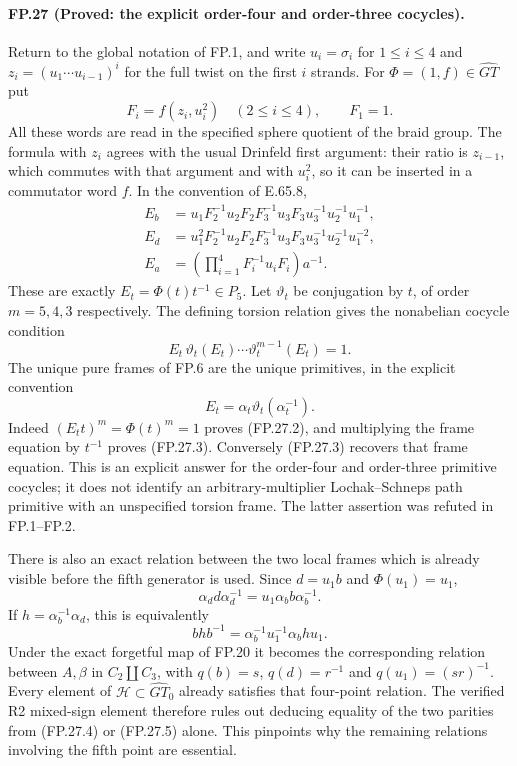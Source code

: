 \paragraph{FP.27 (Proved: the explicit order-four and order-three cocycles).}
Return to the global notation of FP.1, and write
$u_i=\sigma_i$ for $1\leq i\leq4$ and
$z_i=(u_1\cdots u_{i-1})^i$ for the full twist on the first $i$
strands. For $\Phi=(1,f)\in\widehat{GT}$ put
\[
 F_i=f(z_i,u_i^2)\quad(2\leq i\leq4),\qquad F_1=1.
\]
All these words are read in the specified sphere quotient of the braid
group. The formula with $z_i$ agrees with the usual Drinfeld first
argument: their ratio is $z_{i-1}$, which commutes with that argument
and with $u_i^2$, so it can be inserted in a commutator word $f$.
In the convention of E.65.8,
\[
 \begin{split}
 E_b&=u_1F_2^{-1}u_2F_2F_3^{-1}u_3F_3
                         u_3^{-1}u_2^{-1}u_1^{-1},\\
 E_d&=u_1^2F_2^{-1}u_2F_2F_3^{-1}u_3F_3
                         u_3^{-1}u_2^{-1}u_1^{-2},\\
 E_a&=\left(\prod_{i=1}^{4}F_i^{-1}u_iF_i\right)a^{-1}.
 \end{split}
 \tag{FP.27.1}
\]
These are exactly $E_t=\Phi(t)t^{-1}\in P_5$.
Let $\vartheta_t$ be conjugation by $t$, of order $m=5,4,3$ respectively.
The defining torsion relation gives the nonabelian cocycle condition
\[
 E_t\,\vartheta_t(E_t)\cdots\vartheta_t^{m-1}(E_t)=1.
 \tag{FP.27.2}
\]
The unique pure frames of FP.6 are the unique primitives, in the
explicit convention
\[
 E_t=\alpha_t\vartheta_t(\alpha_t^{-1}).
 \tag{FP.27.3}
\]
Indeed $(E_tt)^m=\Phi(t)^m=1$ proves (FP.27.2), and multiplying the
frame equation by $t^{-1}$ proves (FP.27.3). Conversely (FP.27.3)
recovers that frame equation. This is an explicit answer for the
order-four and order-three primitive cocycles; it does not identify an
arbitrary-multiplier Lochak--Schneps path primitive with an unspecified
torsion frame. The latter assertion was refuted in FP.1--FP.2.

There is also an exact relation between the two local frames which is
already visible before the fifth generator is used. Since $d=u_1b$ and
$\Phi(u_1)=u_1$,
\[
 \alpha_d d\alpha_d^{-1}
       =u_1\alpha_b b\alpha_b^{-1}.
 \tag{FP.27.4}
\]
If $h=\alpha_b^{-1}\alpha_d$, this is equivalently
\[
 b h b^{-1}=\alpha_b^{-1}u_1^{-1}\alpha_b h u_1.
 \tag{FP.27.5}
\]
Under the exact forgetful map of FP.20 it becomes the corresponding
relation between $A,\beta$ in $C_2\amalg C_3$, with $q(b)=s$,
$q(d)=r^{-1}$ and $q(u_1)=(sr)^{-1}$. Every element of
$\mathcal H\subset\widehat{GT}_0$ already satisfies that four-point
relation. The verified R2 mixed-sign element therefore rules out
deducing equality of the two parities from (FP.27.4) or (FP.27.5)
alone. This pinpoints why the remaining relations involving the fifth
point are essential.

